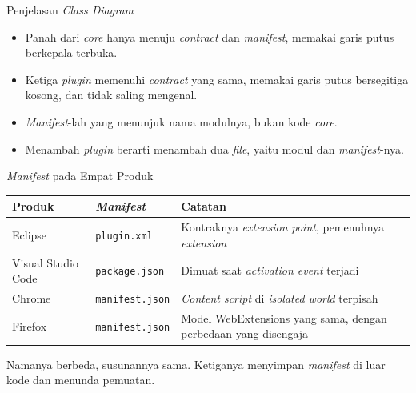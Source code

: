\documentclass[aspectratio=169, table, 12pt]{beamer}
\begin{document}
\begin{frame}{{\Large Penjelasan \textit{Class Diagram}}}
  \vspace{8pt}
  \begin{itemize}\small
    \item Panah dari \textit{core} hanya menuju \textit{contract} dan
      \textit{manifest}, memakai garis putus berkepala terbuka.
    \item Ketiga \textit{plugin} memenuhi \textit{contract} yang sama, memakai
      garis putus bersegitiga kosong, dan tidak saling mengenal.
    \item \textit{Manifest}-lah yang menunjuk nama modulnya, bukan kode
      \textit{core}.
    \item Menambah \textit{plugin} berarti menambah dua \textit{file}, yaitu
      modul dan \textit{manifest}-nya.
  \end{itemize}
\end{frame}

\begin{frame}{{\Large \textit{Manifest} pada Empat Produk}}
  \vspace{8pt}
  \centering
  \small
  \begin{tabularx}{0.95\textwidth}{|l|l|X|}
    \hline
    \textbf{Produk} & \textbf{\textit{Manifest}} & \textbf{Catatan} \\
    \hline
    Eclipse & \texttt{plugin.xml} & Kontraknya \textit{extension point}, pemenuhnya \textit{extension} \\
    \hline
    Visual Studio Code & \texttt{package.json} & Dimuat saat \textit{activation event} terjadi \\
    \hline
    Chrome & \texttt{manifest.json} & \textit{Content script} di \textit{isolated world} terpisah \\
    \hline
    Firefox & \texttt{manifest.json} & Model WebExtensions yang sama, dengan perbedaan yang disengaja \\
    \hline
  \end{tabularx}

  \vspace{8pt}
  {\small Namanya berbeda, susunannya sama. Ketiganya menyimpan \textit{manifest} di luar
  kode dan menunda pemuatan.}
\end{frame}
\end{document}
